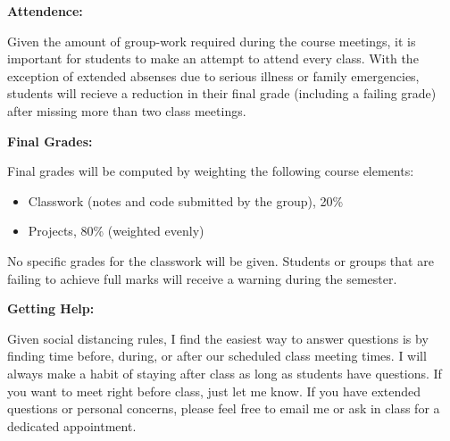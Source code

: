 \documentclass[12pt, a4paper]{article}
\begin{document}
\vspace{12pt}

\textbf{Attendence:} \vspace{6pt}

Given the amount of group-work required during the course meetings, it is
important for students to make an attempt to attend every class. With the
exception of extended absenses due to serious illness or
family emergencies, students will recieve a reduction in their final grade
(including a failing grade) after missing more than two class meetings.

\vspace{12pt}

\textbf{Final Grades:} \vspace{6pt}

Final grades will be computed by weighting the following course elements:

\begin{itemize}\setlength\itemsep{0em}
\item Classwork (notes and code submitted by the group), 20\%
\item Projects, 80\% (weighted evenly)
\end{itemize}

No specific grades for the classwork will be given. Students or groups that are
failing to achieve full marks will receive a warning during the semester.

\vspace{12pt}

\textbf{Getting Help:} \vspace{6pt}

Given social distancing rules, I find the easiest way to answer questions
is by finding time before, during, or after our scheduled class meeting times.
I will always make a habit of staying after class as long as students have
questions. If you want to meet right before class, just let me know.
If you have extended questions or personal concerns, please feel free
to email me or ask in class for a dedicated appointment.
\end{document}
